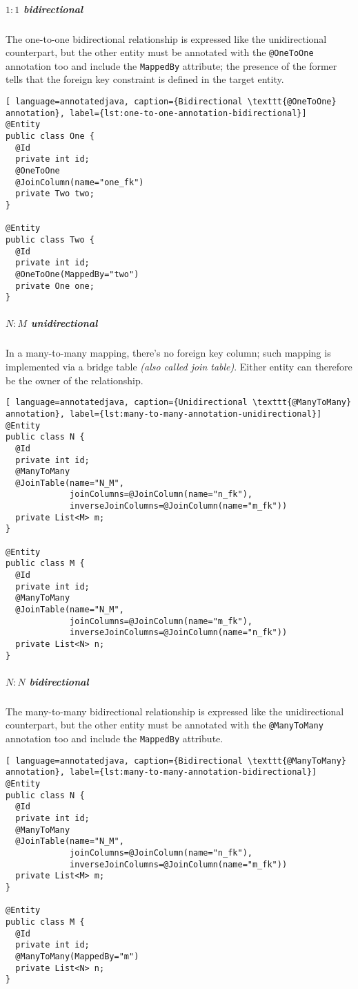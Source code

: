 \documentclass[english]{article}
\begin{document}
\begin{onepage}
  \subparagraph*{\(1:1\) bidirectional}
  The one-to-one bidirectional relationship is expressed like the unidirectional counterpart, but the other entity must be annotated with the \texttt{@OneToOne} annotation too and include the \texttt{MappedBy} attribute;
  the presence of the former tells \jpa that the foreign key constraint is defined in the target entity.

  \begin{lstlisting}[ language=annotatedjava, caption={Bidirectional \texttt{@OneToOne} annotation}, label={lst:one-to-one-annotation-bidirectional}]
@Entity
public class One {
  @Id
  private int id;
  @OneToOne
  @JoinColumn(name="one_fk")
  private Two two;
}

@Entity
public class Two {
  @Id
  private int id;
  @OneToOne(MappedBy="two")
  private One one;
}
\end{lstlisting}
\end{onepage}

\begin{onepage}
  \subparagraph*{\(N:M\) unidirectional}
  In a many-to-many mapping, there's no foreign key column; such mapping is implemented via a bridge table \textit{(also called join table)}.
  Either entity can therefore be the owner of the relationship.

  \begin{lstlisting}[ language=annotatedjava, caption={Unidirectional \texttt{@ManyToMany} annotation}, label={lst:many-to-many-annotation-unidirectional}]
@Entity
public class N {
  @Id
  private int id;
  @ManyToMany
  @JoinTable(name="N_M",
             joinColumns=@JoinColumn(name="n_fk"),
             inverseJoinColumns=@JoinColumn(name="m_fk"))
  private List<M> m;
}

@Entity
public class M {
  @Id
  private int id;
  @ManyToMany
  @JoinTable(name="N_M",
             joinColumns=@JoinColumn(name="m_fk"),
             inverseJoinColumns=@JoinColumn(name="n_fk"))
  private List<N> n;
}
\end{lstlisting}
\end{onepage}

\begin{onepage}
  \subparagraph*{\(N:N\) bidirectional}
  The many-to-many bidirectional relationship is expressed like the unidirectional counterpart, but the other entity must be annotated with the \texttt{@ManyToMany} annotation too and include the \texttt{MappedBy} attribute.

  \begin{lstlisting}[ language=annotatedjava, caption={Bidirectional \texttt{@ManyToMany} annotation}, label={lst:many-to-many-annotation-bidirectional}]
@Entity
public class N {
  @Id
  private int id;
  @ManyToMany
  @JoinTable(name="N_M",
             joinColumns=@JoinColumn(name="n_fk"),
             inverseJoinColumns=@JoinColumn(name="m_fk"))
  private List<M> m;
}

@Entity
public class M {
  @Id
  private int id;
  @ManyToMany(MappedBy="m")
  private List<N> n;
}
\end{lstlisting}
\end{onepage}
\end{document}
